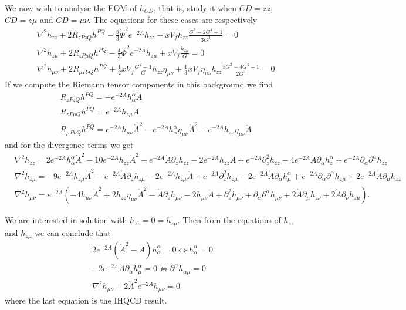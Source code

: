 \documentclass[a4paper,12pt]{article}
\begin{document}
We now wish to analyse the EOM of $h_{CD}$, that is, study it when $CD = zz$, $CD = z\mu$ and $CD = \mu \nu$. The equations for these cases are respectively
\begin{align}
&\nabla^2 h_{zz} + 2 R_{zPzQ} h^{PQ} - \frac{8}{3} {\dot{\Phi}}^2 e^{-2A} h_{zz} + x V_f h_{zz} \frac{G^2 - 2 G^4 +1}{3 G^3} = 0 \\
& \nabla^2 h_{z\mu} + 2 R_{zP\mu Q} h^{PQ} - \frac{4}{3} {\dot{\Phi}}^2 e^{-2A} h_{z \mu} + x V_f \frac{h_{z\mu}}{G} = 0 \\
& \nabla^2 h_{\mu \nu} + 2 R_{\mu P \nu Q} h^{PQ} + \frac{1}{2} x V_f \frac{G^2 - 1}{G} h_{zz} \eta_{\mu \nu} + \frac{1}{3} x V_f \eta_{\mu \nu} h_{zz} \frac{5 G^2 - 4 G^4 -1}{2 G^3} = 0
\end{align}
If we compute the Riemann tensor components in this background we find
\begin{align}
&R_{zPzQ} h^{PQ} = - e^{-2A} h_{\alpha}^\alpha \ddot{A} \\
&R_{zP\mu Q} h^{PQ} = e^{-2A} h_{z \mu} \ddot{A} \\
& R_{\mu P \nu Q} h^{PQ} = e^{-2A} h_{\mu \nu} {\dot{A}}^2 - e^{-2A} h_{\alpha}^\alpha \eta_{\mu \nu} {\dot{A}}^2 - e^{-2A} h_{zz} \eta_{\mu \nu} \ddot{A}
\end{align}
and for the divergence terms we get
\begin{align}
& \nabla^2 h_{zz} = 2 e^{-2A} h_{\alpha}^\alpha {\dot{A}}^2 - 10 e^{-2A} h_{zz}  {\dot{A}}^2  - e^{-2A} \dot{A} \partial_z h_{zz} - 2 e^{-2A} h_{zz} \ddot{A} + e^{-2A} \partial_z^2{h_{zz}} - 4 e^{-2A} \dot{A} \partial_\alpha h_{z}^\alpha + e^{-2A} \partial_\alpha \partial^\alpha h_{zz} \\
& \nabla^2 h_{z \mu} = - 9 e^{-2A} h_{z\mu} {\dot{A}}^2 - e^{-2A} \dot{A} \partial_z h_{z \mu} - 2 e^{-2A} h_{z \mu} \ddot{A} + e^{-2A} \partial_z^2 h_{z\mu} - 2 e^{-2A} \dot{A} \partial_\alpha h_{\mu}^\alpha + e^{-2A} \partial_\alpha \partial^\alpha h_{z\mu} + 2 e^{-2A} \dot{A} \partial_\mu h_{zz} \\
& \nabla^2 h_{\mu \nu} = e^{-2A} \left( -4 h_{\mu\nu} {\dot{A}}^2 + 2 h_{zz} \eta_{\mu\nu} {\dot{A}}^2 - \dot{A} \partial_z h_{\mu \nu} -2 h_{\mu \nu} \ddot{A} + \partial_z^2 h_{\mu \nu} + \partial_\alpha \partial^\alpha h_{\mu \nu} + 2 \dot{A} \partial_\mu h_{z \nu} + 2 \dot{A} \partial_\nu h_{z \mu}\right).
\end{align}

We are interested in solution with $h_{zz} = 0 = h_{z\mu}$. Then from the equations of $h_{zz}$ and $h_{z\mu}$ we can conclude that
\begin{align}
2 e^{-2A}  \left({\dot{A}}^2 - \ddot{A}\right) h_{\alpha}^\alpha = 0 \Leftrightarrow h_{\alpha}^\alpha = 0 \\
-2 e^{-2 A} \dot{A} \partial_\alpha h^{\alpha}_\mu = 0 \Leftrightarrow \partial^\alpha h_{\alpha \mu} = 0 \\
\nabla^2 h_{\mu \nu} + 2 {\dot{A}}^2 e^{-2A} h_{\mu \nu} = 0
\end{align}
where the last equation is the IHQCD result.
\end{document}
